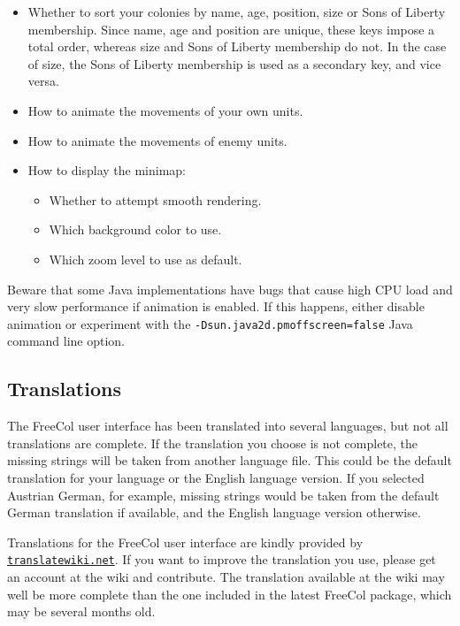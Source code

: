 \documentclass[12pt]{book}
\begin{document}
\begin{itemize}
\item Whether to sort your colonies by name, age, position, size or
Sons of Liberty membership. Since name, age and position are unique,
these keys impose a total order, whereas size and Sons of Liberty
membership do not. In the case of size, the Sons of Liberty membership
is used as a secondary key, and vice versa.

\item How to animate the movements of your own units.

\item How to animate the movements of enemy units.

\item How to display the minimap:

\begin{itemize}
\item Whether to attempt smooth rendering.

\item Which background color to use.

\item Which zoom level to use as default.
\end{itemize}

\end{itemize}

Beware that some Java implementations have bugs that cause high CPU
load and very slow performance if animation is enabled.  If this
happens, either disable animation or experiment with the
\texttt{-Dsun.java2d.pmoffscreen=false} Java command line option.


\hypertarget{translations}{\subsection{Translations}}

The FreeCol user interface has been translated into several languages,
but not all translations are complete. If the translation you choose
is not complete, the missing strings will be taken from another
language file. This could be the default translation for your language
or the English language version. If you selected Austrian German, for
example, missing strings would be taken from the default German
translation if available, and the English language version
otherwise.

Translations for the FreeCol user interface are kindly provided by
\href{http://translatewiki.net}{\tt trans\-late\-wiki.net}. If you want to
improve the translation you use, please get an account at the wiki and
contribute. The translation available at the wiki may well be more
complete than the one included in the latest FreeCol package, which
may be several months old.
\end{document}
